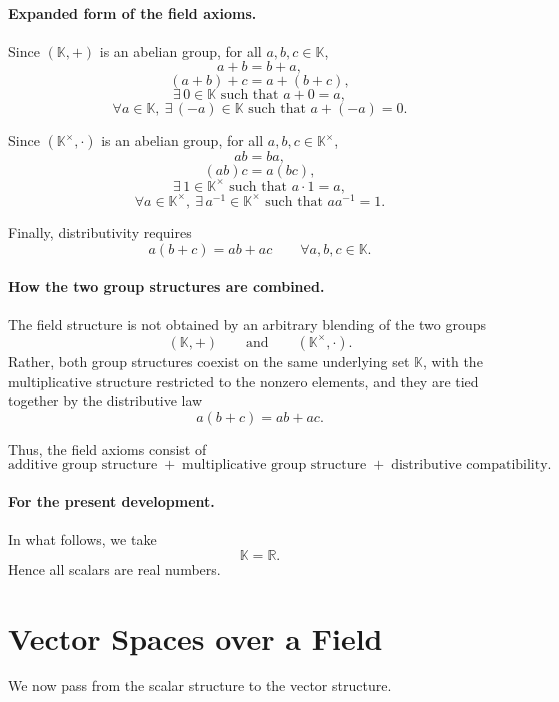 \documentclass{article}
\begin{document}
	\paragraph{Expanded form of the field axioms.}
	Since $(\mathbb{K},+)$ is an abelian group, for all $a,b,c\in\mathbb{K}$,
	$$
	a+b=b+a,
	$$
	$$
	(a+b)+c=a+(b+c),
	$$
	$$
	\exists\,0\in\mathbb{K}\text{ such that }a+0=a,
	$$
	$$
	\forall a\in\mathbb{K},\ \exists\,(-a)\in\mathbb{K}\text{ such that }a+(-a)=0.
	$$
	
	Since $(\mathbb{K}^{\times},\cdot)$ is an abelian group, for all $a,b,c\in\mathbb{K}^{\times}$,
	$$
	ab=ba,
	$$
	$$
	(ab)c=a(bc),
	$$
	$$
	\exists\,1\in\mathbb{K}^{\times}\text{ such that }a\cdot 1=a,
	$$
	$$
	\forall a\in\mathbb{K}^{\times},\ \exists\,a^{-1}\in\mathbb{K}^{\times}\text{ such that }aa^{-1}=1.
	$$
	
	Finally, distributivity requires
	$$
	a(b+c)=ab+ac
	\qquad
	\forall a,b,c\in\mathbb{K}.
	$$
	
	\paragraph{How the two group structures are combined.}
	The field structure is not obtained by an arbitrary blending of the two groups
	$$
	(\mathbb{K},+)
	\qquad\text{and}\qquad
	(\mathbb{K}^{\times},\cdot).
	$$
	Rather, both group structures coexist on the same underlying set $\mathbb{K}$, with the multiplicative structure restricted to the nonzero elements, and they are tied together by the distributive law
	$$
	a(b+c)=ab+ac.
	$$
	
	Thus, the field axioms consist of
	$$
	\text{additive group structure}
	\;+\;
	\text{multiplicative group structure}
	\;+\;
	\text{distributive compatibility}.
	$$
	
	\paragraph{For the present development.}
	In what follows, we take
	$$
	\mathbb{K}=\mathbb{R}.
	$$
	Hence all scalars are real numbers.
	
	\section{Vector Spaces over a Field}
	
	We now pass from the scalar structure to the vector structure.
	
\end{document}
